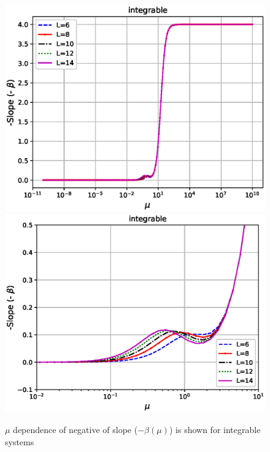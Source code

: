 \documentclass[11pt,a4paper]{article}
\begin{document}
\begin{figure}[!ht]
\begin{center}
\includegraphics[scale=0.47]{new_pics/v3_slope_int_semilogx.eps} 
\includegraphics[scale=0.47]{new_pics/v3_slope_int_semilogx_zoom.eps}
\caption{$\mu$ dependence of negative of slope ($-\beta (\mu)$) is shown for  integrable systems }
\label{slope_nonintegrable_mu}
\end{center}
\end{figure}


\end{document}

